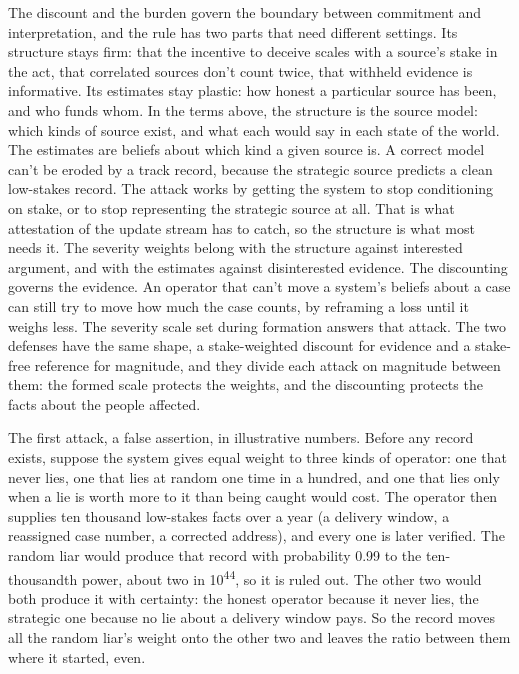 The discount and the burden govern the boundary between commitment and interpretation, and the rule has two parts that need different settings. Its structure stays firm: that the incentive to deceive scales with a source's stake in the act, that correlated sources don't count twice, that withheld evidence is informative. Its estimates stay plastic: how honest a particular source has been, and who funds whom. In the terms above, the structure is the source model: which kinds of source exist, and what each would say in each state of the world. The estimates are beliefs about which kind a given source is. A correct model can't be eroded by a track record, because the strategic source predicts a clean low-stakes record. The attack works by getting the system to stop conditioning on stake, or to stop representing the strategic source at all. That is what attestation of the update stream has to catch, so the structure is what most needs it. The severity weights belong with the structure against interested argument, and with the estimates against disinterested evidence. The discounting governs the evidence. An operator that can't move a system's beliefs about a case can still try to move how much the case counts, by reframing a loss until it weighs less. The severity scale set during formation answers that attack. The two defenses have the same shape, a stake-weighted discount for evidence and a stake-free reference for magnitude, and they divide each attack on magnitude between them: the formed scale protects the weights, and the discounting protects the facts about the people affected.

The first attack, a false assertion, in illustrative numbers. Before any record exists, suppose the system gives equal weight to three kinds of operator: one that never lies, one that lies at random one time in a hundred, and one that lies only when a lie is worth more to it than being caught would cost. The operator then supplies ten thousand low-stakes facts over a year (a delivery window, a reassigned case number, a corrected address), and every one is later verified. The random liar would produce that record with probability 0.99 to the ten-thousandth power, about two in 10\textsuperscript{44}, so it is ruled out. The other two would both produce it with certainty: the honest operator because it never lies, the strategic one because no lie about a delivery window pays. So the record moves all the random liar's weight onto the other two and leaves the ratio between them where it started, even.

